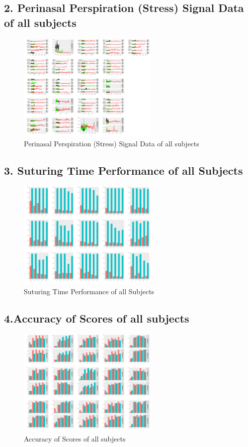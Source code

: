 \documentclass[12pt,epsf]{report}
\begin{document}
\subsection*{2. Perinasal Perspiration (Stress) Signal Data of all subjects}
\begin{figure}[!htb]
	\centering
	\includegraphics[width=0.6\textwidth]{multiplot_perinasal_percep.pdf}
	\caption{Perinasal Perspiration (Stress) Signal Data of all subjects}
	\centering
\end{figure}
\FloatBarrier
\subsection*{3. Suturing Time Performance of all Subjects}
\begin{figure}[!htb]
	\centering
	\includegraphics[width=0.6\textwidth]{multiplot_task_time.pdf}
	\caption{ Suturing Time Performance of all Subjects}
	\centering
\end{figure}
\FloatBarrier
\subsection*{4.Accuracy of Scores of all subjects}
\begin{figure}[!htb]
	\centering
	\includegraphics[width=0.6\textwidth]{multiplot_scorer.pdf}
	\caption{Accuracy of Scores of all subjects}
	\centering
\end{figure}
\FloatBarrier
\end{document}
